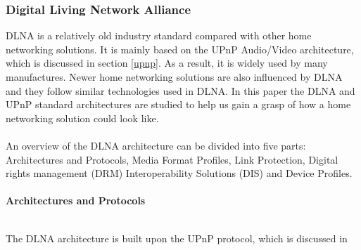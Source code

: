 \subsubsection[DLNA]{Digital Living Network Alliance} 
DLNA is a relatively old industry standard compared with other home networking 
solutions. It is mainly based on the UPnP Audio/Video architecture, which is 
discussed in section \ref{upnp}. As a result, it is widely used by many manufactures. Newer 
home networking solutions are also influenced by DLNA and they follow similar 
technologies used in DLNA. In this paper the DLNA and UPnP standard architectures are studied to help us gain a grasp of how a home networking solution could look like. \\
\\
An overview of the DLNA architecture \cite{dlna_guideline} can be divided into
five parts: Architectures and Protocols, Media Format Profiles, Link Protection,
Digital rights management (DRM) Interoperability Solutions (DIS) and Device
Profiles.\\
\\
\textbf{Architectures and Protocols}\\ 
\begin{table}[htb] 
\caption{Key Technology Ingredients \label{dlna_key_tech}} 
\begin{center} 
\end{center} 
\end{table} 
\\The DLNA architecture is built upon the UPnP protocol, which is discussed in
